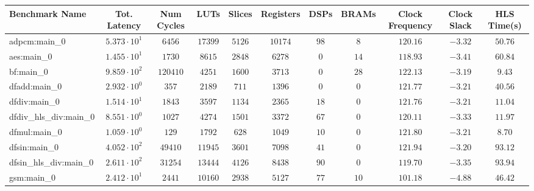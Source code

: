 \begin{tabular}{|l|c|c|c|c|c|c|c|c|c|c|}
\hline
Benchmark Name          & Tot. Latency           & Num Cycles & LUTs       & Slices    & Registers & DSPs    & BRAMs   & Clock Frequency & Clock Slack & HLS Time(s) \\
\hline
adpcm:main\_0           & $ 5.373 \cdot 10^{1} $ & $ 6456   $ & $ 17399  $ & $ 5126  $ & $ 10174 $ & $ 98  $ & $ 8   $ & $ 120.16      $ & $ -3.32   $ & $ 50.76   $ \\
aes:main\_0             & $ 1.455 \cdot 10^{1} $ & $ 1730   $ & $ 8615   $ & $ 2848  $ & $ 6278  $ & $ 0   $ & $ 14  $ & $ 118.93      $ & $ -3.41   $ & $ 60.84   $ \\
bf:main\_0              & $ 9.859 \cdot 10^{2} $ & $ 120410 $ & $ 4251   $ & $ 1600  $ & $ 3713  $ & $ 0   $ & $ 28  $ & $ 122.13      $ & $ -3.19   $ & $ 9.43    $ \\
dfadd:main\_0           & $ 2.932 \cdot 10^{0} $ & $ 357    $ & $ 2189   $ & $ 711   $ & $ 1396  $ & $ 0   $ & $ 0   $ & $ 121.77      $ & $ -3.21   $ & $ 40.56   $ \\
dfdiv:main\_0           & $ 1.514 \cdot 10^{1} $ & $ 1843   $ & $ 3597   $ & $ 1134  $ & $ 2365  $ & $ 18  $ & $ 0   $ & $ 121.76      $ & $ -3.21   $ & $ 11.04   $ \\
dfdiv\_hls\_div:main\_0 & $ 8.551 \cdot 10^{0} $ & $ 1027   $ & $ 4274   $ & $ 1501  $ & $ 3372  $ & $ 67  $ & $ 0   $ & $ 120.11      $ & $ -3.33   $ & $ 11.97   $ \\
dfmul:main\_0           & $ 1.059 \cdot 10^{0} $ & $ 129    $ & $ 1792   $ & $ 628   $ & $ 1049  $ & $ 10  $ & $ 0   $ & $ 121.80      $ & $ -3.21   $ & $ 8.70    $ \\
dfsin:main\_0           & $ 4.052 \cdot 10^{2} $ & $ 49410  $ & $ 11945  $ & $ 3601  $ & $ 7098  $ & $ 41  $ & $ 0   $ & $ 121.94      $ & $ -3.20   $ & $ 93.12   $ \\
dfsin\_hls\_div:main\_0 & $ 2.611 \cdot 10^{2} $ & $ 31254  $ & $ 13444  $ & $ 4126  $ & $ 8438  $ & $ 90  $ & $ 0   $ & $ 119.70      $ & $ -3.35   $ & $ 93.94   $ \\
gsm:main\_0             & $ 2.412 \cdot 10^{1} $ & $ 2441   $ & $ 10160  $ & $ 2938  $ & $ 5127  $ & $ 77  $ & $ 10  $ & $ 101.18      $ & $ -4.88   $ & $ 46.42   $ \\

\end{tabular}
